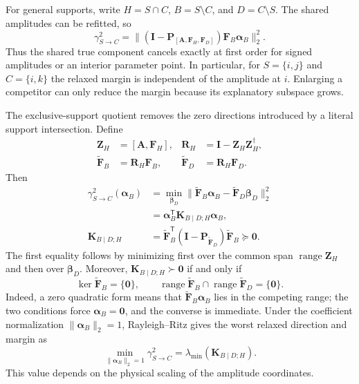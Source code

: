 For general supports, write $H=S\cap C$, $B=S\setminus C$, and
$D=C\setminus S$. The shared amplitudes can be refitted, so
\begin{equation}
 \gamma_{S\rightarrow C}^2
 =\|\left(\bm I-\bm P_{[\bm A,\bm F_H,\bm F_D]}\right)
 \bm F_B\bm\alpha_B\|_2^2.
 \label{eq:supp-shared-support-quotient}
\end{equation}
Thus the shared true component cancels exactly at first order for signed
amplitudes or an interior parameter point. In particular, for $S=\{i,j\}$ and
$C=\{i,k\}$ the relaxed margin is independent of the amplitude at $i$.
Enlarging a competitor can only reduce the margin because its explanatory
subspace grows.

The exclusive-support quotient removes the zero directions introduced by a
literal support intersection. Define
\begin{equation}
 \begin{aligned}
 \bm Z_H&=[\bm A,\bm F_H],
 &\bm R_H&=\bm I-\bm Z_H\bm Z_H^\dagger,\\
 \widetilde{\bm F}_B&=\bm R_H\bm F_B,
 &\widetilde{\bm F}_D&=\bm R_H\bm F_D.
 \end{aligned}
 \label{eq:supp-exclusive-support-residualization}
\end{equation}
Then
\begin{align}
 \gamma_{S\rightarrow C}^2(\bm\alpha_B)
 &=\min_{\bm\beta_D}
 \|\widetilde{\bm F}_B\bm\alpha_B-
   \widetilde{\bm F}_D\bm\beta_D\|_2^2 \nonumber\\
 &=\bm\alpha_B^{\mathsf T}\bm K_{B\mid D;H}\bm\alpha_B,
 \label{eq:supp-conditional-support-matrix}\\
 \bm K_{B\mid D;H}
 &=\widetilde{\bm F}_B^{\mathsf T}
 (\bm I-\bm P_{\widetilde{\bm F}_D})
 \widetilde{\bm F}_B\succeq\bm0.
 \nonumber
\end{align}
The first equality follows by minimizing first over the common span
$\operatorname{range}\bm Z_H$ and then over $\bm\beta_D$. Moreover,
$\bm K_{B\mid D;H}\succ\bm0$ if and only if
\begin{equation}
 \ker\widetilde{\bm F}_B=\{\bm0\},
 \qquad
 \operatorname{range}\widetilde{\bm F}_B
 \cap\operatorname{range}\widetilde{\bm F}_D=\{\bm0\}.
 \label{eq:supp-conditional-pd-condition}
\end{equation}
Indeed, a zero quadratic form means that
$\widetilde{\bm F}_B\bm\alpha_B$ lies in the competing range; the two
conditions force $\bm\alpha_B=\bm0$, and the converse is immediate. Under the
coefficient normalization $\|\bm\alpha_B\|_2=1$, Rayleigh--Ritz gives the
worst relaxed direction and margin as
\begin{equation}
 \min_{\|\bm\alpha_B\|_2=1}\gamma_{S\rightarrow C}^2
 =\lambda_{\min}(\bm K_{B\mid D;H}).
 \label{eq:supp-conditional-worst-direction}
\end{equation}
This value depends on the physical scaling of the amplitude coordinates.

